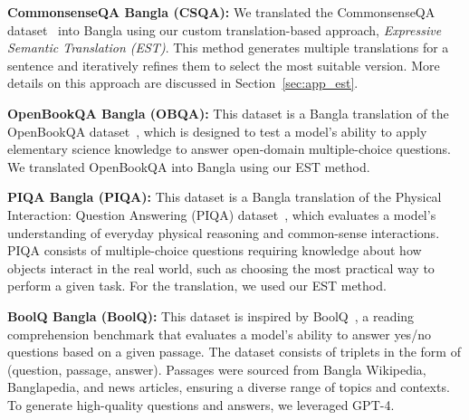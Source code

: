 \noindent  \textbf{CommonsenseQA Bangla (CSQA):} We translated the CommonsenseQA dataset~\cite{talmor2018commonsenseqa} into Bangla using our custom translation-based approach, \textit{Expressive Semantic Translation (EST)}. This method generates multiple translations for a sentence and iteratively refines them to select the most suitable version. More details on this approach are discussed in Section~\ref{sec:app_est}.


\noindent \textbf{OpenBookQA Bangla (OBQA):} This dataset is a Bangla translation of the OpenBookQA dataset~\cite{mihaylov2018can}, which is designed to test a model's ability to apply elementary science knowledge to answer open-domain multiple-choice questions. We translated OpenBookQA into Bangla using our EST method.

\noindent  \textbf{PIQA Bangla (PIQA):} This dataset is a Bangla translation of the Physical Interaction: Question Answering (PIQA) dataset~\cite{bisk2020piqa}, which evaluates a model's understanding of everyday physical reasoning and common-sense interactions. PIQA consists of multiple-choice questions requiring knowledge about how objects interact in the real world, such as choosing the most practical way to perform a given task. For the translation, we used our EST method. 

\noindent  \textbf{BoolQ Bangla (BoolQ):} This dataset is inspired by BoolQ~\cite{clark2019boolq}, a reading comprehension benchmark that evaluates a model's ability to answer yes/no questions based on a given passage. The dataset consists of triplets in the form of (question, passage, answer). Passages were sourced from Bangla Wikipedia, Banglapedia, and news articles, ensuring a diverse range of topics and contexts. To generate high-quality questions and answers, we leveraged GPT-4.


